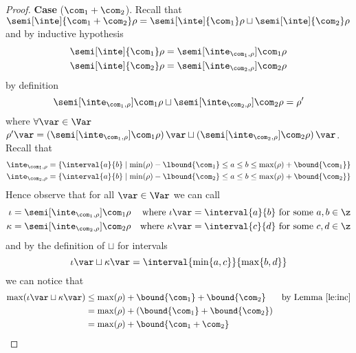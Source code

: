 \begin{proof}
  \noindent
  \textbf{Case} (\(\com_1 + \com_2\)).
  Recall that
  \({\semi[\inte]{\com_1 + \com_2}\rho} = {\semi[\inte]{\com_1}\rho}
  \sqcup {\semi[\inte]{\com_2}\rho}\) and by inductive hypothesis
  \begin{align*}
    \semi[\inte]{\com_1}\rho & = \semi[\inte_{\com_1, \rho}]{\com_1}\rho \\
    \semi[\inte]{\com_2}\rho & = \semi[\inte_{\com_2, \rho}]{\com_2}\rho
  \end{align*}
  by definition
  \begin{equation*}
    \semi[\inte_{\com_1, \rho}]{\com_1}\rho \sqcup \semi[\inte_{\com_2, \rho}]{\com_2}\rho = \rho'
  \end{equation*}
  where \(\forall \var \in \Var\)
  \(\rho'\var = {\left(\semi[\inte_{\com_1,
        \rho}]{\com_1}\rho\right)\var} \sqcup
  {\left(\semi[\inte_{\com_2, \rho}]{\com_2}\rho\right)
    \var}\).  Recall that
  \begin{align*}
    \inte_{\com_1, \rho} & = \{\interval{a}{b} \mid \min(\rho) - \lbound{\com_1} \leq a \leq b \leq \max(\rho) + \bound{\com_1}\} \\
    \inte_{\com_2, \rho} & = \{\interval{a}{b} \mid \min(\rho) - \lbound{\com_2} \leq a \leq b \leq \max(\rho) + \bound{\com_2}\}
  \end{align*}
  Hence observe that for all \(\var\in\Var\) we can call
  \begin{align*}
    \iota & = \semi[\inte_{\com_1, \rho}]{\com_1}\rho & \text{where } \iota\var = \interval{a}{b} \text{ for some } a,b\in\z \\
    \kappa & = \semi[\inte_{\com_2, \rho}]{\com_2}\rho & \text{where }\kappa\var = \interval{c}{d} \text{ for some } c,d \in\z
  \end{align*}
  and by the definition of \(\sqcup\) for intervals 
  \begin{equation*}
    \iota\var \sqcup \kappa\var = \interval{\min\{a,c\}}{\max\{b,d\}}
  \end{equation*}
  we can notice that
  \begin{align*}
    \max(\iota\var\sqcup\kappa\var) & \leq \max(\rho) + \bound{\com_1} + \bound{\com_2} & \text{by Lemma~\ref{le:inc}}\\
                                    & = \max(\rho) + (\bound{\com_1} + \bound{\com_2}) \\
                                    & = \max(\rho) + \bound{\com_1 + \com_2}

\end{align*}
\end{proof}
